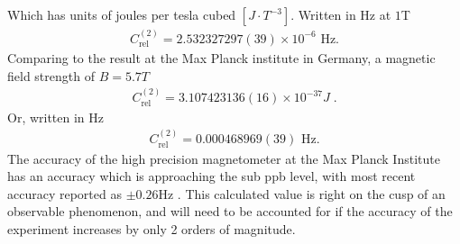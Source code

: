         \noindent Which has units of joules per tesla cubed $\left[J \cdot T^{-3}\right]$. Written in Hz at $1$T
        \begin{align}
            C_{\text{rel}}^{(2)} =2.532327297(39)\times 10^{-6} \text{  Hz.}
        \end{align}
        \noindent Comparing to the result at the Max Planck institute in Germany, a magnetic field strength of $B = 5.7T$
        \begin{align}
            C_{\text{rel}}^{(2)} = 3.107423136(16)\times10^{-37} J\;.
        \end{align}
        \noindent Or, written in Hz
        \begin{align}
            C_{\text{rel}}^{(2)} = 0.000468969(39) \text{  Hz.}
        \end{align}
        \noindent The accuracy of the high precision magnetometer at the Max Planck Institute has an accuracy which is approaching the sub ppb level, with most recent accuracy reported as $\pm 0.26$Hz \cite{Schneider_Sikora_Dickopf_Müller_Oreshkina_Rischka_Valuev_Ulmer_Walz_Harman_et_al._2022}. This calculated value is right on the cusp of an observable phenomenon, and will need to be accounted for if the accuracy of the experiment increases by only 2 orders of magnitude.